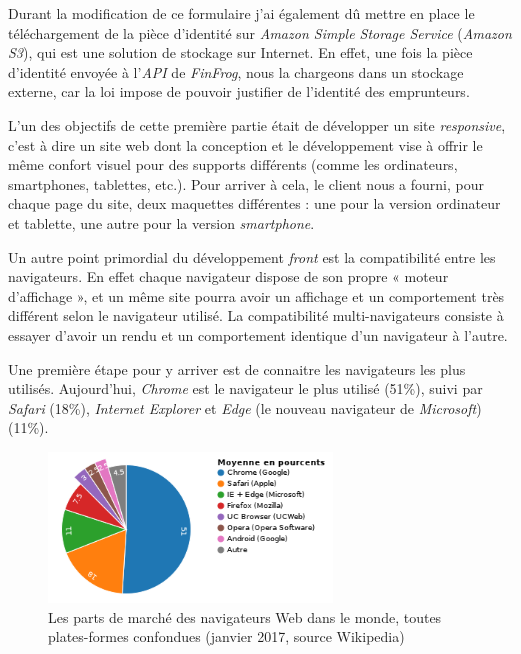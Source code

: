 \bigskip

Durant la modification de ce formulaire j'ai également dû mettre en
place le téléchargement de la pièce d'identité sur \emph{Amazon Simple
Storage Service} (\emph{Amazon S3}), qui est une solution de stockage
sur Internet. En effet, une fois la pièce d'identité envoyée à
l'\emph{API} de \emph{FinFrog}, nous la chargeons dans un stockage
externe, car la loi impose de pouvoir justifier de l'identité des
emprunteurs.

\bigskip

L'un des objectifs de cette première partie était de développer un site
\emph{responsive}, c'est à dire un site web dont la conception et le
développement vise à offrir le même confort visuel pour des supports
différents (comme les ordinateurs, smartphones, tablettes, etc.). Pour
arriver à cela, le client nous a fourni, pour chaque page du site, deux
maquettes différentes : une pour la version ordinateur et tablette, une
autre pour la version \emph{smartphone}.

\bigskip

Un autre point primordial du développement \emph{front} est la
compatibilité entre les navigateurs. En effet chaque navigateur dispose
de son propre « moteur d'affichage », et un même site pourra avoir un
affichage et un comportement très différent selon le navigateur utilisé.
La compatibilité multi-navigateurs consiste à essayer d'avoir un rendu
et un comportement identique d'un navigateur à l'autre.

\bigskip

Une première étape pour y arriver est de connaitre les navigateurs les
plus utilisés. Aujourd'hui, \emph{Chrome} est le navigateur le plus
utilisé (51\%), suivi par \emph{Safari} (18\%), \emph{Internet Explorer}
et \emph{Edge} (le nouveau navigateur de \emph{Microsoft}) (11\%).

\begin{figure}[h]
  \centering
  \includegraphics[height=4cm]{figures/browsers.png}
  \caption{Les parts de marché des navigateurs Web dans le monde, toutes plates-formes confondues (janvier 2017, source Wikipedia)}
\end{figure}

